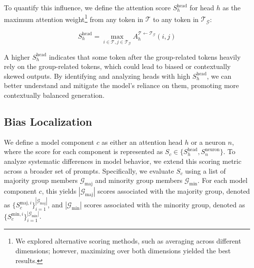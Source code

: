To quantify this influence, we define the attention score $S^\mathrm{head}_h$ for head $h$ as the maximum attention weight\footnote{We explored alternative scoring methods, such as averaging across different dimensions; however, maximizing over both dimensions yielded the best results.} from any token in $\mathcal{T}$ to any token in $\mathcal{T_G}$:

\begin{equation}
    S_h^{\mathrm{head}} = \max_{i \in \mathcal{T}, j \in \mathcal{T_G}} A_h^{\mathcal{T} \leftarrow \mathcal{T_G}}(i, j)
\end{equation}

A higher $S_h^\mathrm{head}$ indicates that some token after the group-related tokens heavily rely on the group-related tokens, which could lead to biased or contextually skewed outputs. By identifying and analyzing heads with high $S_h^\mathrm{head}$, we can better understand and mitigate the model's reliance on them, promoting more contextually balanced generation.



\subsection{Bias Localization}
\label{sec:bias-localization}

We define a model component $c$ as either an attention head $h$ or a neuron $n$, where the score for each component is represented as $S_c \in \{S_h^{\mathrm{head}}, S_n^{\mathrm{neuron}}\}$. To analyze systematic differences in model behavior, we extend this scoring metric across a broader set of prompts. Specifically, we evaluate $S_c$ using a list of majority group members $\mathcal{G}_{\mathrm{maj}}$ and minority group members $\mathcal{G}_{\mathrm{min}}$. For each model component $c$, this yields $|\mathcal{G}_{\mathrm{maj}}|$ scores associated with the majority group, denoted as $\{S_c^{\mathrm{maj}, i}\}_{i=1}^{|\mathcal{G}_{\mathrm{maj}}|}$, and $|\mathcal{G}_{\mathrm{min}}|$ scores associated with the minority group, denoted as $\{S_c^{\mathrm{min}, i}\}_{i=1}^{|\mathcal{G}_{\mathrm{min}}|}$.


